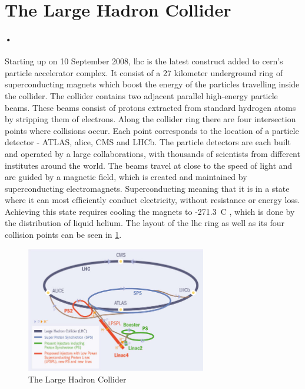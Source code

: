 \documentclass[a4paper, 12pt]{report}
\begin{document}
\section{The Large Hadron Collider}
\label{sec:lhc}
\paragraph{•}
Starting up on 10 September 2008, \gls{lhc} is the latest construct added to \gls{cern}'s particle accelerator complex\cite{lhc}.
It consist of a 27 kilometer underground ring of superconducting magnets which boost the energy of the particles travelling inside the collider.
The collider contains two adjacent parallel high-energy particle beams.
These beams consist of protons extracted from standard hydrogen atoms by stripping them of electrons.
Along the collider ring there are four intersection points where collisions occur.
Each point corresponds to the location of a particle detector - ATLAS, \gls{alice}, CMS and LHCb.
The particle detectors are each built and operated by a large collaborations, with thousands of scientists from different institutes around the world.
The beams travel at close to the speed of light and are guided by a magnetic field, which is created and maintained by superconducting electromagnets.
Superconducting meaning that it is in a state where it can most efficiently conduct electricity, without resistance or energy loss.
Achieving this state requires cooling the magnets to -271.3\degree~C , which is done by the distribution of liquid helium.
The layout of the \gls{lhc} ring as well as its four collision points can be seen in \ref{fig:lhc}.

\begin{figure}[h!]
  \centering
    \includegraphics[width=0.7\textwidth]{images/lhc-ring.jpg}
     \caption{The Large Hadron Collider}
    \label{fig:lhc}
\end{figure}
\end{document}
